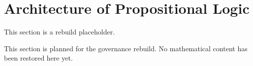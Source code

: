 \section{Architecture of Propositional Logic}

\begin{tcolorbox}[colback=gray!6, colframe=gray!40, arc=2pt,
  left=6pt, right=6pt, top=4pt, bottom=4pt,
  title={\small\textbf{Architecture Toolkit - Planned}},
  fonttitle=\small\bfseries]
This section is a rebuild placeholder.
\end{tcolorbox}

This section is planned for the governance rebuild. No mathematical content has
been restored here yet.
